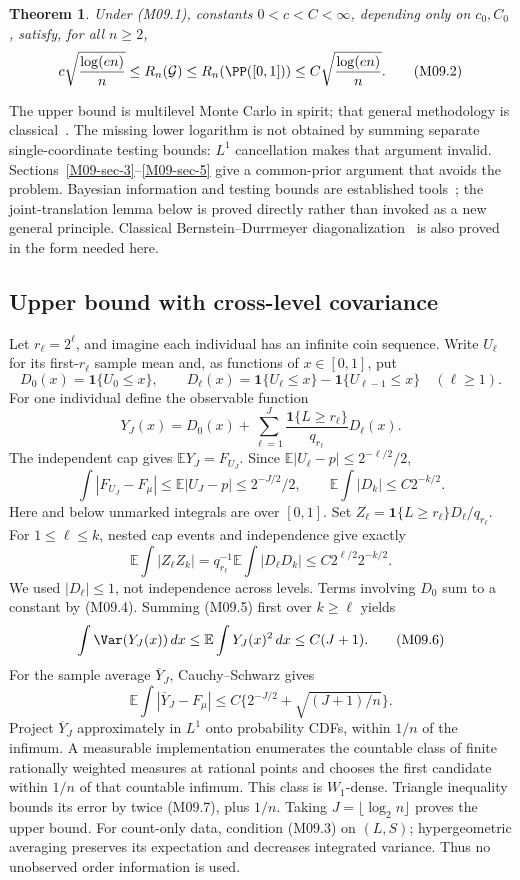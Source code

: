 \documentclass[11pt,a4paper]{article}
\newtheorem{theorem}{Theorem}[section]
\theoremstyle{definition}\newtheorem{definition}[theorem]{Definition}
\theoremstyle{remark}\newtheorem{remark}[theorem]{Remark}
\newcommand{\E}{\mathbb E}\newcommand{\one}{\mathbf 1}\newcommand{\1}{\mathbf 1}
\numberwithin{equation}{section}
\begin{document}
\begin{theorem}\label{M09-th:main}
Under (M09.1), constants $0<c<C<\infty$, depending only on $c_0,C_0$, satisfy, for all $n\ge2$,
\[
 c\sqrt{\frac{\log(en)}n}
 \le R_n(\mathcal G)
 \le R_n(\PP([0,1]))
 \le C\sqrt{\frac{\log(en)}n}.\tag{M09.2}
\]
\end{theorem}
The upper bound is multilevel Monte Carlo in spirit; that general methodology is classical~\cite{ref019}. The missing lower logarithm is not obtained by summing separate single-coordinate testing bounds: $L^1$ cancellation makes that argument invalid. Sections~\ref{M09-sec-3}--\ref{M09-sec-5} give a common-prior argument that avoids the problem. Bayesian information and testing bounds are established tools~\cite{ref023,ref024}; the joint-translation lemma below is proved directly rather than invoked as a new general principle. Classical Bernstein--Durrmeyer diagonalization~\cite{ref021} is also proved in the form needed here.

\subsection{Upper bound with cross-level covariance}\label{M09-sec-2}
Let $r_\ell=2^\ell$, and imagine each individual has an infinite coin sequence. Write $U_\ell$ for its first-$r_\ell$ sample mean and, as functions of $x\in[0,1]$, put
\[
 D_0(x)=\1\{U_0\le x\},\qquad
 D_\ell(x)=\1\{U_\ell\le x\}-\1\{U_{\ell-1}\le x\}\quad(\ell\ge1).
\]
For one individual define the observable function
\[
 Y_J(x)=D_0(x)+\sum_{\ell=1}^J
             \frac{\1\{L\ge r_\ell\}}{q_{r_\ell}}D_\ell(x).
\tag{M09.3}
\]
The independent cap gives $\E Y_J=F_{U_J}$. Since $\E|U_\ell-p|\le2^{-\ell/2}/2$,
\[
 \int|F_{U_J}-F_\mu|\le\E|U_J-p|\le2^{-J/2}/2,
 \qquad \E\int|D_k|\le C2^{-k/2}.\tag{M09.4}
\]
Here and below unmarked integrals are over $[0,1]$. Set $Z_\ell=\1\{L\ge r_\ell\}D_\ell/q_{r_\ell}$. For $1\le\ell\le k$, nested cap events and independence give exactly
\[
 \E\int|Z_\ell Z_k|
 =q_{r_\ell}^{-1}\E\int|D_\ell D_k|
 \le C2^{\ell/2}2^{-k/2}.\tag{M09.5}
\]
We used $|D_\ell|\le1$, not independence across levels. Terms involving $D_0$ sum to a constant by (M09.4). Summing (M09.5) first over $k\ge\ell$ yields
\[
 \int\Var(Y_J(x))\,dx\le\E\int Y_J(x)^2\,dx\le C(J+1).\tag{M09.6}
\]
For the sample average $\overline Y_J$, Cauchy--Schwarz gives
\[
 \E\int|\overline Y_J-F_\mu|
 \le C\{2^{-J/2}+\sqrt{(J+1)/n}\}.\tag{M09.7}
\]
Project $\overline Y_J$ approximately in $L^1$ onto probability CDFs, within $1/n$ of the infimum. A measurable implementation enumerates the countable class of finite rationally weighted measures at rational points and chooses the first candidate within $1/n$ of that countable infimum. This class is $W_1$-dense. Triangle inequality bounds its error by twice (M09.7), plus $1/n$. Taking $J=\lfloor\log_2 n\rfloor$ proves the upper bound. For count-only data, condition (M09.3) on $(L,S)$; hypergeometric averaging preserves its expectation and decreases integrated variance. Thus no unobserved order information is used.
\end{document}
